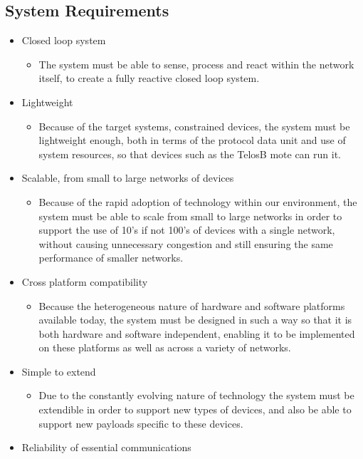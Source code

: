 \subsection{System Requirements} %
\label{sub:system_requirements}
\begin{itemize}
	\item Closed loop system
	\begin{itemize}
		\item The system must be able to sense, process and react within the network itself, to create a fully reactive closed loop system.
	\end{itemize}
	\item Lightweight
	\begin{itemize}
		\item Because of the target systems, constrained devices, the system must be lightweight enough, both in terms of the protocol data unit and use of system resources, so that devices such as the TelosB mote can run it.
	\end{itemize}
	\item Scalable, from small to large networks of devices
	\begin{itemize}
		\item Because of the rapid adoption of technology within our environment, the system must be able to scale from small to large networks in order to support the use of 10's if not 100's of devices with a single network, without causing unnecessary congestion and still ensuring the same performance of smaller networks.
	\end{itemize}
	\item Cross platform compatibility
	\begin{itemize}
		\item Because the heterogeneous nature of hardware and software platforms available today, the system must be designed in such a way so that it is both hardware and software independent, enabling it to be implemented on these platforms as well as across a variety of networks.
	\end{itemize}
	\item Simple to extend
	\begin{itemize}
		\item Due to the constantly evolving nature of technology the system must be extendible in order to support new types of devices, and also be able to support new payloads specific to these devices.
	\end{itemize}
	\item Reliability of essential communications

\end{itemize}

